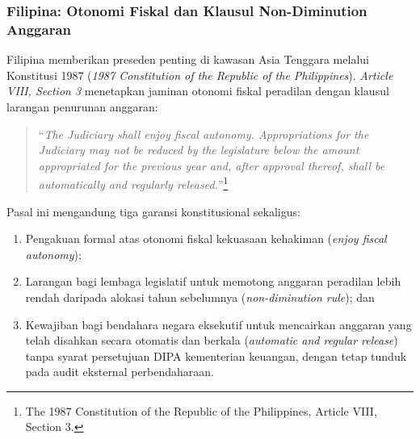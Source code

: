 \documentclass[12pt,a4paper,twocolumn]{article}
\begin{document}
\subsubsection{Filipina: Otonomi Fiskal dan Klausul Non-Diminution Anggaran}
Filipina memberikan preseden penting di kawasan Asia Tenggara melalui Konstitusi 1987 (\textit{1987 Constitution of the Republic of the Philippines}). \textit{Article VIII, Section 3} menetapkan jaminan otonomi fiskal peradilan dengan klausul larangan penurunan anggaran:
\begin{quote}
    ``\textit{The Judiciary shall enjoy fiscal autonomy. Appropriations for the Judiciary may not be reduced by the legislature below the amount appropriated for the previous year and, after approval thereof, shall be automatically and regularly released.}''\footnote{The 1987 Constitution of the Republic of the Philippines, Article VIII, Section 3.}
\end{quote}
Pasal ini mengandung tiga garansi konstitusional sekaligus:
\begin{enumerate}
    \item Pengakuan formal atas otonomi fiskal kekuasaan kehakiman (\textit{enjoy fiscal autonomy});
    \item Larangan bagi lembaga legislatif untuk memotong anggaran peradilan lebih rendah daripada alokasi tahun sebelumnya (\textit{non-diminution rule}); dan
    \item Kewajiban bagi bendahara negara eksekutif untuk mencairkan anggaran yang telah disahkan secara otomatis dan berkala (\textit{automatic and regular release}) tanpa syarat persetujuan DIPA kementerian keuangan, dengan tetap tunduk pada audit eksternal perbendaharaan.
\end{enumerate}
\end{document}
